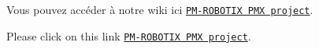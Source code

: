 Vous pouvez accéder à notre wiki ici \href{https://github.com/pmrobotix/PMX/wiki}{\tt P\+M-\/\+R\+O\+B\+O\+T\+IX P\+MX project}.

Please click on this link \href{https://github.com/pmrobotix/PMX/wiki}{\tt P\+M-\/\+R\+O\+B\+O\+T\+IX P\+MX project}. 